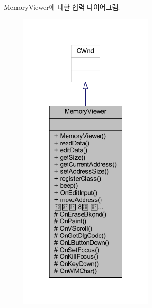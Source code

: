 Memory\+Viewer에 대한 협력 다이어그램\+:\nopagebreak
\begin{figure}[H]
\begin{center}
\leavevmode
\includegraphics[width=193pt]{class_memory_viewer__coll__graph}
\end{center}
\end{figure}

